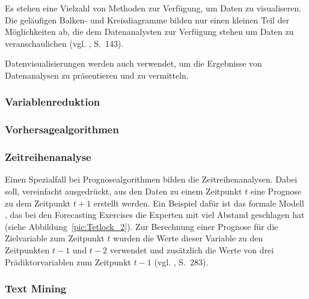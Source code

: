 Es stehen eine Vielzahl von Methoden zur Verfügung, um Daten zu visualiseren.
Die geläufigen Balken- und Kreisdiagramme bilden nur einen kleinen Teil der
Möglichkeiten ab, die dem Datenanalysten zur Verfügung stehen um Daten zu
veranschaulichen (vgl. \cite{Dinov}, S.~143). 

Datenvisualisierungen werden auch verwendet, um die Ergebnisse von Datenanalysen
zu präsentieren und zu vermitteln. 

\subsubsection{Variablenreduktion}

\subsubsection{Vorhersagealgorithmen}



\subsubsection{Zeitreihenanalyse}

Einen Spezialfall bei Prognosealgorithmen bilden die Zeitreihenanalysen. Dabei
soll, vereinfacht ausgedrückt, aus den Daten zu einem Zeitpunkt $t$ eine Prognose zu dem Zeitpunkt $t+1$
erstellt werden. Ein Beispiel dafür ist das formale Modell , das bei den Forecasting
Exercises die Experten mit viel Abstand geschlagen hat (siehe Abbildung~\ref{pic:Tetlock_2}).  
Zur Berechnung einer Prognose für die Zielvariable zum Zeitpunkt $t$ wurden die Werte dieser Variable
zu den Zeitpunkten $t-1$ und $t-2$ verwendet und zusätzlich die Werte von drei Prädiktorvariablen zum Zeitpunkt $t-1$   
(vgl. \cite{Tetlock}, S.~283).

\subsubsection{Text Mining}

